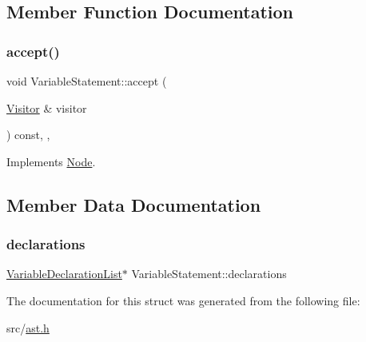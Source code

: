 \subsection{Member Function Documentation}
\mbox{\label{struct_variable_statement_a55446c8cfa8fd620de4b72f7efca86bd}} 
\subsubsection{\texorpdfstring{accept()}{accept()}}
{\footnotesize\ttfamily void Variable\+Statement\+::accept (\begin{DoxyParamCaption}\item[{\hyperlink{struct_visitor}{Visitor} \&}]{visitor }\end{DoxyParamCaption}) const\hspace{0.3cm}{\ttfamily [inline]}, {\ttfamily [override]}, {\ttfamily [virtual]}}



Implements \hyperlink{struct_node_a10bd7af968140bbf5fa461298a969c71}{Node}.



\subsection{Member Data Documentation}
\mbox{\label{struct_variable_statement_a9d1cdb228d5cb079e228180532cec942}} 
\subsubsection{\texorpdfstring{declarations}{declarations}}
{\footnotesize\ttfamily \hyperlink{struct_variable_declaration_list}{Variable\+Declaration\+List}$\ast$ Variable\+Statement\+::declarations}



The documentation for this struct was generated from the following file\+:\begin{DoxyCompactItemize}
\item 
src/\hyperlink{ast_8h}{ast.\+h}\end{DoxyCompactItemize}
